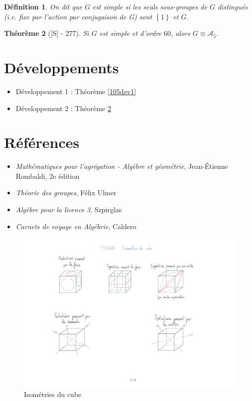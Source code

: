 \documentclass[10pt, a4paper, parskip=full, twoside, twocolumn]{report}
\newtheorem{definition}{Définition}
\newtheorem{theorem}[definition]{Théorème}
\begin{document}
\begin{definition}
	On dit que $G$ est \emph{simple} si les seuls sous-groupes de $G$ distingués (\emph{i.e.} fixe par l'action par conjugaison de G) sont $\left\{1\right\}$ et $G$.
\end{definition}

\begin{tcolorbox}[
    breakable, %
    colback=developpement, %
    colframe=gray!0!black, %
    boxrule=0pt, %
    arc=1mm, %
	boxsep=0pt,
	left=0pt, right=0pt, top=0pt, bottom=0pt
]
\begin{theorem}[\textnormal{[S] - 277}]
	\label{105dev2}
	Si $G$ est simple et d'ordre $60$, alors $G\cong \mathcal{A}_5$.
\end{theorem}
\end{tcolorbox}

\section*{Développements}
\begin{itemize}
	\item Développement 1 : Théorème \ref{105dev1}
	\item Développement 2 : Théorème \ref{105dev2}
\end{itemize}

\section*{Références}
\begin{itemize}
	\item[R] \emph{Mathématiques pour l'agrégation - Algèbre et géométrie}, Jean-Étienne Rombaldi, 2e édition
	\item[U] \emph{Théorie des groupes}, Félix Ulmer
	\item[S] \emph{Algèbre pour la licence 3}, Szpirglas
	\item[C] \emph{Carnets de voyage en Algébrie}, Caldero
\end{itemize}

\begin{figure}[!htb]
	\centering
	\includegraphics[trim={0 0 0 0},clip,width=1\linewidth]{img/101.pdf}
	\caption{Isométries du cube}
\end{figure}
\end{document}

